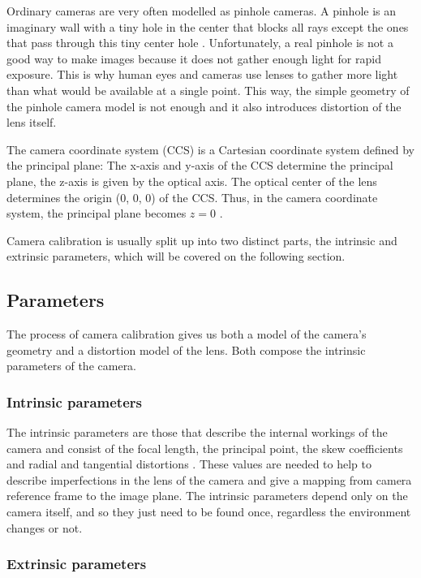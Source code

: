 \documentclass[msc, a4paper, classic, en]{ufbathesis}
\begin{document}
Ordinary cameras are very often modelled as pinhole cameras. A pinhole is an imaginary wall with a tiny hole in the center that blocks all rays except the ones that pass through this tiny center hole \cite{bradski2008learning}. Unfortunately, a real pinhole is not a good way to make images because it does not gather enough light for rapid exposure. This is why human eyes and cameras use lenses to gather more light than what would be available at a single point. This way, the simple geometry of the pinhole camera model is not enough and it also introduces distortion of the lens itself.

The camera coordinate system (CCS) is a Cartesian coordinate system defined by the principal plane: The x-axis and y-axis of the CCS determine the principal plane, the z-axis is given by the optical axis. The optical center of the lens determines the origin (0, 0, 0) of the CCS. Thus, in the camera coordinate system, the principal plane becomes ${ z = 0 }$ \cite{hanning2011high}.

Camera calibration is usually split up into two distinct parts, the intrinsic and extrinsic parameters, which will be covered on the following section.

\subsection{Parameters}

The process of camera calibration gives us both a model of the camera's geometry and a distortion model of the lens. Both compose the intrinsic parameters of the camera.

\subsubsection{Intrinsic parameters}

The intrinsic parameters are those that describe the internal workings  of the camera and consist of the focal length, the principal point, the skew coefficients and radial and tangential distortions \cite{tillapaugh2008indirect}. These values are needed to help to describe imperfections in the lens of the camera and give a mapping from camera reference frame to the image plane. The intrinsic parameters depend only on the camera itself, and so they just need to be found once, regardless the environment changes or not.

\subsubsection{Extrinsic parameters}
\end{document}
